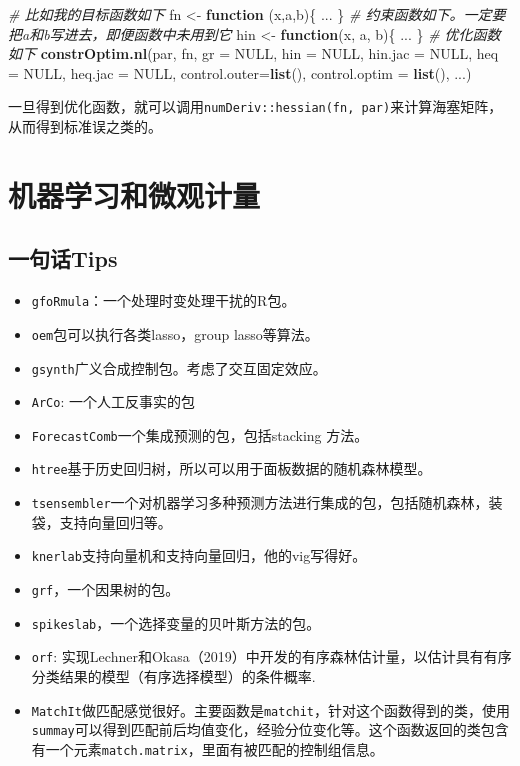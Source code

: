 \documentclass[
]{book}
\newenvironment{Shaded}{\begin{snugshade}}{\end{snugshade}}
\newcommand{\CommentTok}[1]{\textcolor[rgb]{0.56,0.35,0.01}{\textit{#1}}}
\newcommand{\ControlFlowTok}[1]{\textcolor[rgb]{0.13,0.29,0.53}{\textbf{#1}}}
\newcommand{\DataTypeTok}[1]{\textcolor[rgb]{0.13,0.29,0.53}{#1}}
\newcommand{\KeywordTok}[1]{\textcolor[rgb]{0.13,0.29,0.53}{\textbf{#1}}}
\newcommand{\NormalTok}[1]{#1}
\newcommand{\OtherTok}[1]{\textcolor[rgb]{0.56,0.35,0.01}{#1}}
\newcommand{\StringTok}[1]{\textcolor[rgb]{0.31,0.60,0.02}{#1}}
\providecommand{\tightlist}{%
  \setlength{\itemsep}{0pt}\setlength{\parskip}{0pt}}
\begin{document}
\begin{Shaded}
\begin{Highlighting}[]
\CommentTok{# 比如我的目标函数如下}
\NormalTok{fn <-}\StringTok{ }\ControlFlowTok{function}\NormalTok{ (x,a,b)\{}
\NormalTok{    ...}
\NormalTok{\}}
\CommentTok{# 约束函数如下。一定要把a和b写进去，即便函数中未用到它}
\NormalTok{hin <-}\StringTok{ }\ControlFlowTok{function}\NormalTok{(x, a, b)\{}
\NormalTok{    ...}
\NormalTok{\}}
\CommentTok{# 优化函数如下}
\KeywordTok{constrOptim.nl}\NormalTok{(par, fn, }\DataTypeTok{gr =} \OtherTok{NULL}\NormalTok{, }
\DataTypeTok{hin =} \OtherTok{NULL}\NormalTok{, }\DataTypeTok{hin.jac =} \OtherTok{NULL}\NormalTok{, }\DataTypeTok{heq =} \OtherTok{NULL}\NormalTok{, }\DataTypeTok{heq.jac =} \OtherTok{NULL}\NormalTok{, }
\DataTypeTok{control.outer=}\KeywordTok{list}\NormalTok{(), }\DataTypeTok{control.optim =} \KeywordTok{list}\NormalTok{(), ...)}
\end{Highlighting}
\end{Shaded}

一旦得到优化函数，就可以调用\texttt{numDeriv::hessian(fn,\ par)}来计算海塞矩阵，从而得到标准误之类的。

\hypertarget{ML}{%
\chapter{机器学习和微观计量}\label{ML}}

\hypertarget{ux4e00ux53e5ux8bddtips-7}{%
\section{一句话Tips}\label{ux4e00ux53e5ux8bddtips-7}}

\begin{itemize}
\tightlist
\item
  \texttt{gfoRmula}：一个处理时变处理干扰的R包。
\item
  \texttt{oem}包可以执行各类lasso，group lasso等算法。
\item
  \texttt{gsynth}广义合成控制包。考虑了交互固定效应。
\item
  \texttt{ArCo}: 一个人工反事实的包
\item
  \texttt{ForecastComb}一个集成预测的包，包括stacking 方法。
\item
  \texttt{htree}基于历史回归树，所以可以用于面板数据的随机森林模型。
\item
  \texttt{tsensembler}一个对机器学习多种预测方法进行集成的包，包括随机森林，装袋，支持向量回归等。
\item
  \texttt{knerlab}支持向量机和支持向量回归，他的vig写得好。
\item
  \texttt{grf}，一个因果树的包。
\item
  \texttt{spikeslab}，一个选择变量的贝叶斯方法的包。
\item
  \texttt{orf}: 实现Lechner和Okasa（2019）中开发的有序森林估计量，以估计具有有序分类结果的模型（有序选择模型）的条件概率.
\item
  \texttt{MatchIt}做匹配感觉很好。主要函数是\texttt{matchit}，针对这个函数得到的类，使用\texttt{summay}可以得到匹配前后均值变化，经验分位变化等。这个函数返回的类包含有一个元素\texttt{match.matrix}，里面有被匹配的控制组信息。
\end{itemize}
\end{document}
